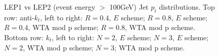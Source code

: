 \begin{figure}[H]
\hfill
{}\hfill
{}\hfill
\caption{LEP1 vs LEP2 (event energy $>$ 100GeV) Jet $p_t$ distributions. Top row: anti-$k_t$, left to right: $R=0.4$, $E$ scheme; $R=0.8$, $E$ scheme; $R=0.4$, WTA mod p scheme; $R=0.8$, WTA mod p scheme. Bottom row: $k_t$, left to right: $N=2$, $E$ scheme; $N=3$, $E$ scheme; $N=2$, WTA mod p scheme; $N=3$; WTA mod p scheme.}  
\end{figure}

